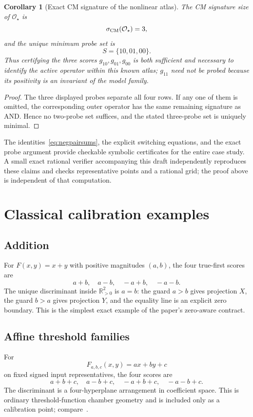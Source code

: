 \documentclass[11pt]{article}
\newtheorem{corollary}[theorem]{Corollary}
\theoremstyle{definition}
\theoremstyle{remark}
\newcommand{\R}{\mathbb{R}}
\begin{document}
\begin{corollary}[Exact CM signature of the nonlinear atlas]\label{cor:starprobe}
The CM signature size of $\mathcal O_\star$ is
\[
 \sigma_{\rm CM}(\mathcal O_\star)=3,
\]
and the unique minimum probe set is
\[
 S=\{10,01,00\}.
\]
Thus certifying the three scores $g_{10},g_{01},g_{00}$ is both sufficient and necessary to identify the active operator within this known atlas; $g_{11}$ need not be probed because its positivity is an invariant of the model family.
\end{corollary}

\begin{proof}
The three displayed probes separate all four rows. If any one of them is omitted, the corresponding outer operator has the same remaining signature as AND. Hence no two-probe set suffices, and the stated three-probe set is uniquely minimal.
\end{proof}

The identities~\eqref{eq:negpairsums}, the explicit switching equations, and the exact probe argument provide checkable symbolic certificates for the entire case study. A small exact rational verifier accompanying this draft independently reproduces these claims and checks representative points and a rational grid; the proof above is independent of that computation.

\section{Classical calibration examples}\label{sec:examples}

\subsection{Addition}
For $F(x,y)=x+y$ with positive magnitudes $(a,b)$, the four true-first scores are
\[
 a+b,\quad a-b,\quad -a+b,\quad -a-b.
\]
The unique discriminant inside $\R_{>0}^2$ is $a=b$: the guard $a>b$ gives projection $X$, the guard $b>a$ gives projection $Y$, and the equality line is an explicit zero boundary. This is the simplest exact example of the paper's zero-aware contract.

\subsection{Affine threshold families}
For
\[
 F_{a,b,c}(x,y)=ax+by+c
\]
on fixed signed input representatives, the four scores are
\[
 a+b+c,\quad a-b+c,\quad -a+b+c,\quad -a-b+c.
\]
The discriminant is a four-hyperplane arrangement in coefficient space. This is ordinary threshold-function chamber geometry and is included only as a calibration point; compare~\cite{Anthony2026}.
\end{document}
